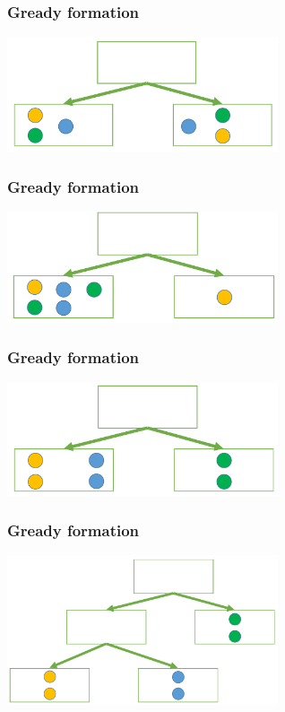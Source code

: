 \documentclass[default]{beamer}
\begin{document}
	\begin{frame}
		\frametitle{Gready formation}
		\centering
		\includegraphics[width=0.6\textwidth]{trees15.png}
	\end{frame}

	\begin{frame}
		\frametitle{Gready formation}
		\centering
		\includegraphics[width=0.6\textwidth]{trees16.png}
	\end{frame}


	\begin{frame}
		\frametitle{Gready formation}
		\centering
		\includegraphics[width=0.6\textwidth]{trees17.png}
	\end{frame}

	\begin{frame}
		\frametitle{Gready formation}
		\centering
		\includegraphics[width=0.6\textwidth]{trees18.png}
	\end{frame}
\end{document}
